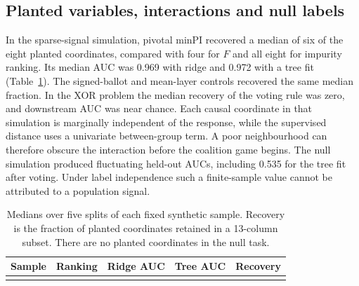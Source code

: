 \subsection{Planted variables, interactions and null labels}
In the sparse-signal simulation, pivotal minPI recovered a median of six of the eight planted coordinates, compared with four for $F$ and all eight for impurity ranking. Its median AUC was 0.969 with ridge and 0.972 with a tree fit (Table~\ref{tab:synthetic}). The signed-ballot and mean-layer controls recovered the same median fraction. In the XOR problem the median recovery of the voting rule was zero, and downstream AUC was near chance. Each causal coordinate in that simulation is marginally independent of the response, while the supervised distance uses a univariate between-group term. A poor neighbourhood can therefore obscure the interaction before the coalition game begins. The null simulation produced fluctuating held-out AUCs, including 0.535 for the tree fit after voting. Under label independence such a finite-sample value cannot be attributed to a population signal.
\begin{table}[tbp]
\centering\small
\caption{Medians over five splits of each fixed synthetic sample. Recovery is the fraction of planted coordinates retained in a 13-column subset. There are no planted coordinates in the null task.}
\label{tab:synthetic}
\begin{tabular}{@{}llrrr@{}}
\toprule Sample & Ranking & Ridge AUC & Tree AUC & Recovery\\
\midrule
\\
\bottomrule
\end{tabular}
\end{table}
